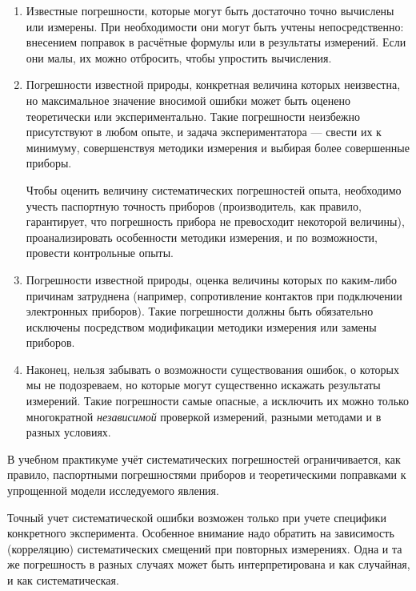 \begin{enumerate}
    \item Известные погрешности, которые могут быть достаточно точно вычислены
или измерены. При необходимости они могут быть учтены непосредственно:
внесением поправок в расчётные формулы или в результаты измерений.
Если они малы, их можно отбросить, чтобы упростить вычисления.

    \item Погрешности известной природы, конкретная величина которых неизвестна,
но максимальное значение вносимой ошибки может быть оценено теоретически
или экспериментально. Такие погрешности неизбежно присутствуют в любом
опыте, и задача экспериментатора --- свести их к минимуму,
совершенствуя методики измерения и выбирая более совершенные приборы.

    Чтобы оценить величину систематических погрешностей опыта, необходимо
учесть паспортную точность приборов (производитель, как правило, гарантирует,
что погрешность прибора не превосходит некоторой величины), проанализировать
особенности методики измерения, и по возможности, провести контрольные
опыты.

    \item Погрешности известной природы, оценка величины которых по каким-либо
причинам затруднена (например, сопротивление контактов при подключении
электронных приборов). Такие погрешности должны быть обязательно исключены
посредством модификации методики измерения или замены приборов.

    \item Наконец, нельзя забывать о возможности существования ошибок, о
которых мы не подозреваем, но которые могут существенно искажать результаты
измерений. Такие погрешности самые опасные, а исключить их можно только
многократной \emph{независимой} проверкой измерений, разными методами
и в разных условиях.
\end{enumerate}

В учебном практикуме учёт систематических погрешностей ограничивается,
как правило, паспортными погрешностями приборов и теоретическими поправками
к упрощенной модели исследуемого явления.

Точный учет систематической ошибки возможен только при учете специфики конкретного эксперимента. Особенное внимание надо обратить на зависимость (корреляцию) систематических смещений при повторных измерениях. Одна и та же погрешность в разных случаях может быть интерпретирована и как случайная, и как систематическая.


